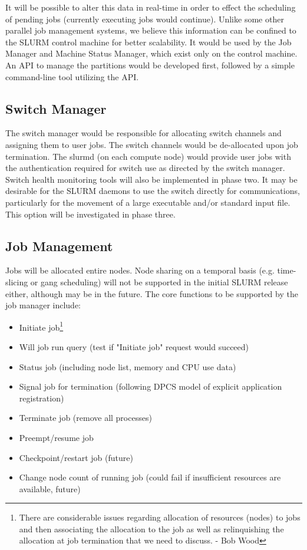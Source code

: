 It will be possible to alter this data in real-time in order to effect the
scheduling of pending jobs (currently executing jobs would continue). Unlike some
other parallel job management systems, we believe this information can be
confined to the SLURM control machine for better scalability. It would be used
by the Job Manager and Machine Status Manager, which exist only on the control
machine. An API to manage the partitions would be developed first, followed by
a simple command-line tool utilizing the API.

\subsection{Switch Manager}

The switch manager would be responsible for allocating switch channels and assigning 
them to user jobs. The switch channels would be de-allocated upon job termination. 
The slurmd (on each compute node) would provide user jobs with the authentication 
required for switch use as directed by the switch manager. Switch health monitoring tools will 
also be implemented in phase two. It may be desirable for the SLURM daemons to use the
switch directly for communications, particularly for the movement of a large 
executable and/or standard input file. This option will be investigated in phase
three. 

\subsection{Job Management}

Jobs will be allocated entire nodes. Node sharing on a temporal basis (e.g.
time-slicing or  gang scheduling) will not be supported in the initial SLURM 
release either, although may be in the future. The core functions to be supported 
by the job manager include:
\begin{itemize}
\item Initiate job\footnote{There are considerable issues regarding allocation 
of resources (nodes) to jobs and then associating the  allocation to the job 
as well as relinquishing the allocation at job termination that we need to 
discuss. - Bob Wood}
\item Will job run query (test if "Initiate job" request would succeed)
\item Status job (including node list, memory and CPU use data)
\item Signal job for termination (following DPCS model of explicit application
registration)
\item Terminate job (remove all processes)
\item Preempt/resume job 
\item Checkpoint/restart job (future)
\item Change node count of running job (could fail if insufficient resources are 
available, future)
\end{itemize}

